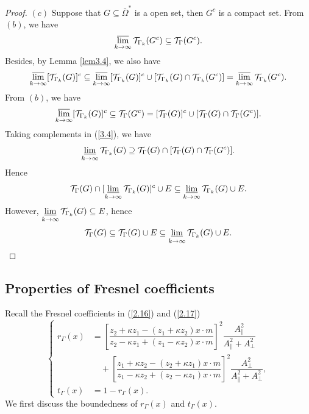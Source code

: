\documentclass[a4paper,12pt,]{article}
\numberwithin{equation}{section}
\numberwithin{equation}{section} \allowdisplaybreaks
\begin{document}
\begin{proof}
   $(c)$ Suppose that $G \subseteq \bar{\Omega}^{\ast}$ is a open set, then $G^{c}$ is a compact set. From $(b)$, we have
   $$\varlimsup_{k\rightarrow \infty}\mathcal{T}_{\Gamma_{k}}(G^{c}) \subseteq \mathcal{T}_{\Gamma}(G^{c}).$$
   Besides, by Lemma \ref{lem3.4}, we also have
   $$\varlimsup_{k\rightarrow \infty}[\mathcal{T}_{\Gamma_{k}}(G)]^{c} \subseteq \varlimsup_{k\rightarrow \infty}[\mathcal{T}_{\Gamma_{k}}(G)]^{c} \cup [\mathcal{T}_{\Gamma_{k}}(G) \cap \mathcal{T}_{\Gamma_{k}}(G^{c})] = \varlimsup_{k\rightarrow \infty}\mathcal{T}_{\Gamma_{k}}(G^{c}).$$
   From $(b)$, we have
   \begin{equation}\label{3.4}
     \varlimsup_{k\rightarrow \infty}[\mathcal{T}_{\Gamma_{k}}(G)]^{c} \subseteq \mathcal{T}_{\Gamma}(G^{c}) = [\mathcal{T}_{\Gamma}(G)]^{c} \cup [\mathcal{T}_{\Gamma}(G) \cap \mathcal{T}_{\Gamma}(G^{c})].
   \end{equation}
   Taking complements in (\ref{3.4}), we have
   $$\varliminf_{k\rightarrow \infty}\mathcal{T}_{\Gamma_{k}}(G) \supseteq \mathcal{T}_{\Gamma}(G) \cap [\mathcal{T}_{\Gamma}(G) \cap \mathcal{T}_{\Gamma}(G^{c})].$$
   Hence
   $$\mathcal{T}_{\Gamma}(G) \cap [\varliminf_{k\rightarrow \infty}\mathcal{T}_{\Gamma_{k}}(G)]^{c} \cup E \subseteq \varliminf_{k\rightarrow \infty}\mathcal{T}_{\Gamma_{k}}(G) \cup E.$$
   However, $\varliminf\limits_{k\rightarrow \infty}\mathcal{T}_{\Gamma_{k}}(G) \subseteq E$, hence
   $$\mathcal{T}_{\Gamma}(G) \subseteq \mathcal{T}_{\Gamma}(G) \cup E \subseteq \varliminf_{k\rightarrow \infty}\mathcal{T}_{\Gamma_{k}}(G) \cup E.$$

\end{proof}

\subsection{Properties of Fresnel coefficients}

Recall the Fresnel coefficients in (\ref{2.16}) and (\ref{2.17})
\begin{equation*}
  \begin{cases}
    r_{\Gamma}(x) \!\!\!\!&= \left[\dfrac{z_{2} + \kappa z_{1} - (z_{1} + \kappa z_{2}) x \cdot m}{z_{2} - \kappa z_{1} + (z_{1} - \kappa z_{2}) x \cdot m} \right]^{2} \dfrac{A_{\parallel}^{2}}{A_{\parallel}^{2} + A_{\bot}^{2}} \\
    \!\!\!\!&\quad+ \left[ \dfrac{z_{1} + \kappa z_{2} - (z_{2} + \kappa z_{1}) x \cdot m}{z_{1} - \kappa z_{2} + (z_{2} - \kappa z_{1}) x \cdot m}\right]^{2} \dfrac{A_{\bot}^{2}}{A_{\parallel}^{2} + A_{\bot}^{2}},  \\
    t_{\Gamma}(x) \!\!\!\!&= 1 - r_{\Gamma}(x).
  \end{cases}
\end{equation*}
We first discuss the boundedness of $r_{\Gamma}(x)$ and $t_{\Gamma}(x)$.
\end{document}
